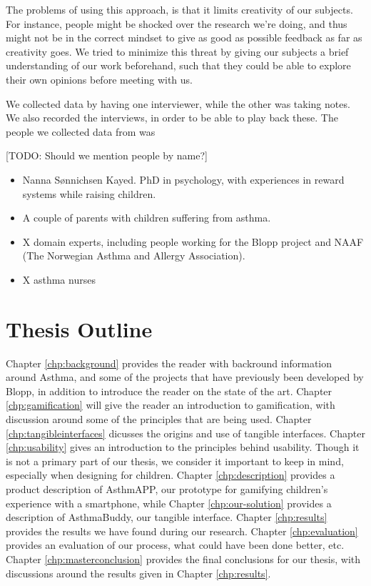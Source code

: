 The problems of using this approach, is that it limits creativity of our subjects. For instance, people might be shocked over the research we're doing, and thus might not be in the correct mindset to give as good as possible feedback as far as creativity goes. We tried to minimize this threat by giving our subjects a brief understanding of our work beforehand, such that they could be able to explore their own opinions before meeting with us.

We collected data by having one interviewer, while the other was taking notes. We also recorded the interviews, in order to be able to play back these. The people we collected data from was

[TODO: Should we mention people by name?]
\begin{itemize}
  \item Nanna S\o nnichsen Kayed. PhD in psychology, with experiences in reward systems while raising children.  
  \item A couple of parents with children suffering from asthma. 
  \item X domain experts, including people working for the Blopp project and NAAF (The Norwegian Asthma and Allergy Association).  
  \item X asthma nurses
\end{itemize} 

\section{Thesis Outline}
Chapter \ref{chp:background} provides the reader with backround information around Asthma, and some of the projects that have previously been developed by Blopp, in addition to introduce the reader on the state of the art. 
Chapter \ref{chp:gamification} will give the reader an introduction to gamification, with discussion around some of the principles that are being used. 
Chapter \ref{chp:tangibleinterfaces} dicusses the origins and use of tangible interfaces.
Chapter \ref{chp:usability} gives an introduction to the principles behind usability. Though it is not a primary part of our thesis, we consider it important to keep in mind, especially when designing for children.
Chapter \ref{chp:description} provides a product description of AsthmAPP, our prototype for gamifying children's experience with a smartphone, while Chapter \ref{chp:our-solution} provides a description of AsthmaBuddy, our tangible interface.
Chapter \ref{chp:results} provides the results we have found during our research.
Chapter \ref{chp:evaluation} provides an evaluation of our process, what could have been done better, etc. 
Chapter \ref{chp:masterconclusion} provides the final conclusions for our thesis, with discussions around the results given in Chapter \ref{chp:results}.          
